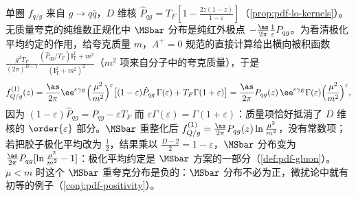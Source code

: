 \begin{example}[胶子中的夸克]\label{ex:pdf-quark-in-gluon}
单圈 $f_{q/g}$ 来自 $g\to q\bar q$，$D$ 维核 $\hat P_{qg}=T_F[1-\frac{2z(1-z)}{1-\varepsilon}]$（\cref{prop:pdf-lo-kernels}）。无质量夸克的纯维数正规化中 $\MSbar$ 分布是纯红外极点 $-\frac{\as}{2\pi}\frac1\varepsilon P_{qg}$。为看清极化平均约定的作用，给夸克质量 $m$，$A^+=0$ 规范的直接计算给出横向被积函数 $\frac{g^2T_F}{(2\pi)^{D-1}}\frac{(\hat P_{qg}/T_F)\bm l_{\mathrm T}^2+m^2}{(\bm l_{\mathrm T}^2+m^2)^2}$（$m^2$ 项来自分子中的夸克质量），于是
\[
f^{(1)}_{Q/g}(z)=\frac{\as}{2\pi}\ee^{\varepsilon\gamma_E}\Big(\frac{\mu^2}{m^2}\Big)^{\varepsilon}\big[(1-\varepsilon)\hat P_{qg}\,\Gamma(\varepsilon)+T_F\Gamma(1+\varepsilon)\big]
=\frac{\as}{2\pi}P_{qg}(z)\,\ee^{\varepsilon\gamma_E}\Gamma(\varepsilon)\Big(\frac{\mu^2}{m^2}\Big)^{\varepsilon},
\]
因为 $(1-\varepsilon)\hat P_{qg}=P_{qg}-\varepsilon T_F$ 而 $\varepsilon\Gamma(\varepsilon)=\Gamma(1+\varepsilon)$：质量项恰好抵消了 $D$ 维核的 $\order{\varepsilon}$ 部分。$\MSbar$ 重整化后 $f^{(1)}_{Q/g}=\frac{\as}{2\pi}P_{qg}(z)\ln\frac{\mu^2}{m^2}$，没有常数项；若把胶子极化平均改为 $\frac12$，结果乘以 $\frac{D-2}{2}=1-\varepsilon$，$\MSbar$ 分布变为 $\frac{\as}{2\pi}P_{qg}[\ln\frac{\mu^2}{m^2}-1]$：极化平均约定是 $\MSbar$ 方案的一部分（\cref{def:pdf-gluon}）。$\mu<m$ 时这个 $\MSbar$ 重夸克分布是负的：$\MSbar$ 分布不必为正，微扰论中就有初等的例子（\cref{conj:pdf-positivity}）。
\end{example}
